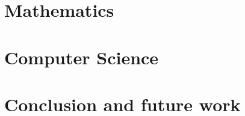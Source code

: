 \documentclass{book}
\author{\docauthor}
\date{\docdate}
\title{\doctitle}
\newcommand{\importchapter}[1]{}
\newcommand{\docrhead}{}
\begin{document}
\maketitle

\newpage
\thispagestyle{plain}
\renewcommand{\docrhead}{Abstract}
\importchapter{summary.tex}


\setcounter{tocdepth}{2}

\renewcommand{\docrhead}{Table of contents}

\newpage
\thispagestyle{plain}
\tableofcontents
\newpage
\thispagestyle{plain}

\renewcommand{\docrhead}{}
\importchapter{introduction.tex}



\part{Mathematics}



\part{Computer Science}


\part{Conclusion and future work}

\importchapter{conclusion.tex}

\newpage
\renewcommand{\docrhead}{Bibliography}
	
\end{document}
